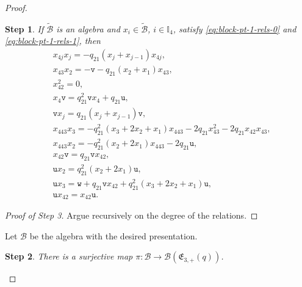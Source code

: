 \documentclass[pdftex]{sigma}
\numberwithin{equation}{section}
\newtheorem{step}{Step}
\newcommand{\toba}{\mathscr B}
\newcommand{\wtoba}{\widetilde{\mathscr B}}
\newcommand{\I}{{\mathbb I}}
\newcommand{\ut}{\mathtt{u}}
\newcommand{\vt}{\mathtt{v}}
\newcommand{\wt}{\mathtt{w}}
\newcommand{\eny}{\mathfrak{E}}
\begin{document}
\begin{proof}
\begin{step}\label{lem:block-pt-1-rels}
If $\wtoba$
is an algebra and $x_i\in\wtoba$, $i\in\I_4$, satisfy \eqref{eq:block-pt-1-rels-0} and \eqref{eq:block-pt-1-rels-1},
then
\begin{align}\label{eq:block-pt-1-rels-others-1}
& x_{4j}x_j=-q_{21}(x_j+x_{j-1})x_{4j},
\\\label{eq:block-pt-1-rels-others-2}
& x_{43}x_2=-\vt-q_{21}(x_2+x_1)x_{43},
\\ \label{eq:block-pt-1-rels-others-prv1}
& x_{42}^2=0,
\\\label{eq:block-pt-1-rels-others-3}
& x_4\vt=q_{21}^2\vt x_4+q_{21}\ut,
\\\label{eq:block-pt-1-rels-others-4}
& \vt x_j=q_{21}(x_j+x_{j-1})\vt,
\\\label{eq:block-pt-1-rels-others-5}
& x_{443}x_3 = -q_{21}^2(x_3+2x_2+x_1)x_{443}-2q_{21}x_{43}^2-2q_{21}x_{42}x_{43},
\\\label{eq:block-pt-1-rels-others-6}
& x_{443}x_2 = -q_{21}^2(x_2+2x_1)x_{443}-2q_{21}\ut,
\\\label{eq:block-pt-1-rels-others-7}
& x_{42}\vt = q_{21}\vt x_{42},
\\\label{eq:block-pt-1-rels-others-8}
& \ut x_2 =q_{21}^2(x_2+2x_1)\ut,
\\\label{eq:block-pt-1-rels-others-9}
&\ut x_3 = \wt+q_{21}\vt x_{42}+q_{21}^2(x_3+2x_2+x_1)\ut,
\\\label{eq:block-pt-1-rels-others-10}
& \ut x_{42} = x_{42}\ut.
\end{align}
\end{step}

\begin{proof}[Proof of Step 3]
Argue recursively on the degree of the relations.
\end{proof}

Let $\toba$ be the algebra with the desired presentation.

\begin{step}%
There is a surjective map $\pi\colon \toba \to \toba(\eny_{3,+}(q))$.
\end{step}


\end{proof}
\end{document}
